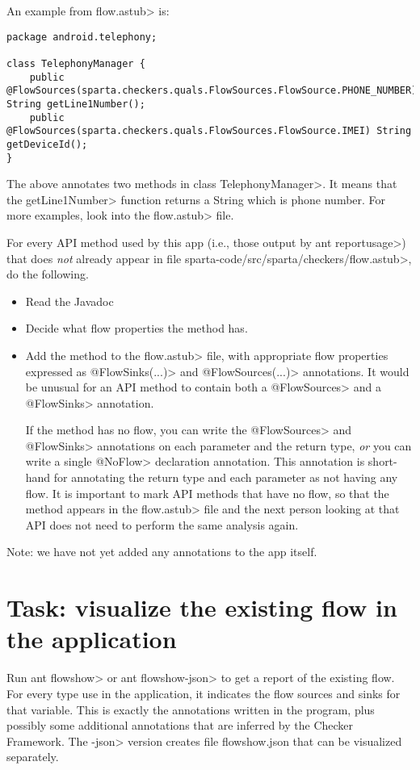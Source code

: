 An example from \<flow.astub> is:

\begin{Verbatim}
package android.telephony;

class TelephonyManager {
    public @FlowSources(sparta.checkers.quals.FlowSources.FlowSource.PHONE_NUMBER) String getLine1Number();
    public @FlowSources(sparta.checkers.quals.FlowSources.FlowSource.IMEI) String getDeviceId();
}
\end{Verbatim}

\noindent
The above annotates two methods in class \<TelephonyManager>.
It means that the \<getLine1Number> function returns a String which is
phone number.  For more examples, look into the \<flow.astub> file.

For every API method used by this app (i.e., those output by \<ant
reportusage>) that does \emph{not} already appear in file
\<sparta-code/src/sparta/checkers/flow.astub>, do the following.
\begin{itemize}
\item
Read the Javadoc
\item
Decide what flow properties the method has.
\item
Add the method to the \<flow.astub> file, with
appropriate flow properties expressed as \<@FlowSinks(...)> and
\<@FlowSources(...)> annotations.
It would be unusual for an API method to contain both a \<@FlowSources>
and a \<@FlowSinks> annotation.

If the method has no flow, you can write the 
\<@FlowSources>
and \<@FlowSinks> annotations on each parameter and the return type, \emph{or} you can write a single 
\<@NoFlow> declaration annotation.
This annotation is short-hand for annotating the return type and each
parameter as not having any flow.
It is important to mark API methods that have no flow, so that the method
appears in the \<flow.astub> file and the next person looking at that
API does not need to perform the same analysis again.
\end{itemize}


Note: we have not yet added any annotations to the app itself.


\section{Task: visualize the existing flow in the application}

Run \<ant flowshow> or \<ant flowshow-json> to get a report of the
existing flow.
For every type use in the application, it indicates the flow sources
and sinks for that variable. This is exactly the annotations written
in the program, plus possibly some additional annotations that are
inferred by the Checker Framework.
The \<-json> version creates file flowshow.json that can be visualized
separately.

